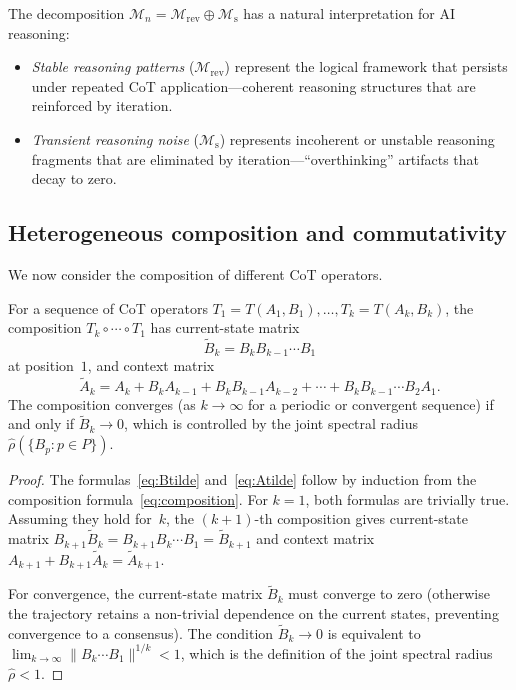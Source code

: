 \begin{remark}\label{rem:interpretation}
  The decomposition $\mathcal{M}_n=\mathcal{M}_{\mathrm{rev}}\oplus
  \mathcal{M}_{\mathrm{s}}$ has a natural interpretation for AI reasoning:
  \begin{itemize}
    \item \emph{Stable reasoning patterns} ($\mathcal{M}_{\mathrm{rev}}$)
      represent the logical framework that persists under repeated CoT
      application---coherent reasoning structures that are reinforced by
      iteration.
    \item \emph{Transient reasoning noise} ($\mathcal{M}_{\mathrm{s}}$)
      represents incoherent or unstable reasoning fragments that are eliminated
      by iteration---``overthinking'' artifacts that decay to zero.
  \end{itemize}
\end{remark}

\subsection{Heterogeneous composition and commutativity}

We now consider the composition of different CoT operators.

\begin{proposition}\label{prop:hetero}
  For a sequence of CoT operators $T_1=T(A_1,B_1),\dots,T_k=T(A_k,B_k)$,
  the composition $T_k\circ\cdots\circ T_1$ has current-state matrix
  \begin{equation}\label{eq:Btilde}
    \tilde{B}_k = B_k B_{k-1}\cdots B_1
  \end{equation}
  at position~$1$, and context matrix
  \begin{equation}\label{eq:Atilde}
    \tilde{A}_k = A_k + B_k A_{k-1} + B_k B_{k-1}A_{k-2}
    + \cdots + B_k B_{k-1}\cdots B_2 A_1.
  \end{equation}
  The composition converges \textup{(}as $k\to\infty$ for a periodic or
  convergent sequence\textup{)} if and only if $\tilde{B}_k\to 0$, which is
  controlled by the joint spectral radius
  $\hat\rho(\{B_p:p\in P\})$.
\end{proposition}

\begin{proof}
  The formulas~\eqref{eq:Btilde} and~\eqref{eq:Atilde} follow by induction
  from the composition formula~\eqref{eq:composition}. For $k=1$, both
  formulas are trivially true. Assuming they hold for~$k$, the $(k+1)$-th
  composition gives current-state matrix $B_{k+1}\tilde{B}_k=B_{k+1}B_k\cdots
  B_1=\tilde{B}_{k+1}$ and context matrix
  $A_{k+1}+B_{k+1}\tilde{A}_k=\tilde{A}_{k+1}$.

  For convergence, the current-state matrix $\tilde{B}_k$ must converge to
  zero (otherwise the trajectory retains a non-trivial dependence on the
  current states, preventing convergence to a consensus). The condition
  $\tilde{B}_k\to 0$ is equivalent to
  $\lim_{k\to\infty}\|B_k\cdots B_1\|^{1/k}<1$, which is the definition of
  the joint spectral radius $\hat\rho<1$.
\end{proof}

